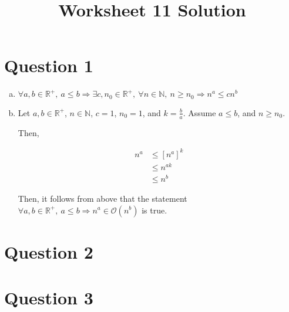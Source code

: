 \documentclass[12pt]{article}
\begin{document}
\title{Worksheet 11 Solution}
\maketitle

\section*{Question 1}
\begin{enumerate}[a.]
    \item

    $\forall a,b \in \mathbb{R}^{+},\: a \leq b \Rightarrow \exists c,n_0 \in \mathbb{R}^{+},
    \:\forall n \in \mathbb{N},\: n \geq n_0 \Rightarrow n^a \leq cn^b$

    \item


    Let $a,b \in \mathbb{R}^{+}$, $n \in \mathbb{N}$, $c = 1$, $n_0 = 1$, and
    $k = \frac{b}{a}$. Assume $a \leq b$, and $n \geq n_0$.

    \bigskip

    Then,

    \begin{align}
        n^a &\leq \left[ n^a \right]^k\\
        &\leq n^{ak}\\
        &\leq n^b
    \end{align}

    Then, it follows from above that the statement $\forall a,b \in \mathbb{R}^{+},
    \:a \leq b \Rightarrow n^a \in \mathcal{O}(n^b)$ is true.


\end{enumerate}

\section*{Question 2}

\section*{Question 3}
\end{document}
